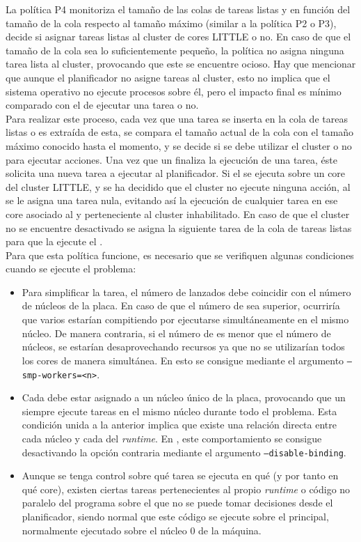 La política P4 monitoriza el tamaño de las colas de tareas listas y en
función del tamaño de la cola respecto al tamaño máximo (similar a la
política P2 o P3), decide si asignar tareas listas al cluster de cores
LITTLE o no. En caso de que el tamaño de la cola sea lo suficientemente
pequeño, la política no asigna ninguna tarea lista al cluster, provocando
que este se encuentre ocioso. Hay que mencionar que aunque el planificador
no asigne tareas al cluster, esto no implica que el sistema operativo no
ejecute procesos sobre él, pero el impacto final es mínimo comparado con el
de ejecutar una tarea o no.\\
Para realizar este proceso, cada vez que una tarea se inserta en la cola de
tareas listas o es extraída de esta, se compara el tamaño actual de la cola
con el tamaño máximo conocido hasta el momento, y se decide si se debe
utilizar el cluster o no para ejecutar acciones. Una vez que un \wt
finaliza la ejecución de una tarea, éste solicita una nueva tarea a
ejecutar al planificador. Si el \wt se ejecuta sobre un core del cluster
LITTLE, y se ha decidido que el cluster no ejecute ninguna acción, al \wt
se le asigna una tarea nula, evitando así la ejecución de cualquier tarea
en ese core asociado al \wt y perteneciente al cluster inhabilitado. En
caso de que el cluster no se encuentre desactivado se asigna la siguiente
tarea de la cola de tareas listas para que la ejecute el \wt.\\
Para que esta política funcione, es necesario que se verifiquen algunas
condiciones cuando se ejecute el problema:

\begin{itemize}
\item Para simplificar la tarea, el número de \wts lanzados debe coincidir
  con el número de núcleos de la placa. En caso de que el número de \wts sea
  superior, ocurriría que varios \wts estarían compitiendo por ejecutarse
  simultáneamente en el mismo núcleo. De manera contraria, si el número de
  \wts es menor que el número de núcleos, se estarían desaprovechando
  recursos ya que no se utilizarían todos los cores de manera simultánea. En
  \nanos esto se consigue mediante el argumento \texttt{--smp-workers=<n>}.
\item Cada \wt debe estar asignado a un núcleo único de la placa,
  provocando que un \wt siempre ejecute tareas en el mismo núcleo durante
  todo el problema. Esta condición unida a la anterior implica que existe una
  relación directa entre cada núcleo y cada \wt del \emph{runtime}. En
  \nanos, este comportamiento se consigue desactivando la opción contraria
  mediante el argumento \texttt{--disable-binding}.
\item Aunque se tenga control sobre qué tarea se ejecuta en qué \wt (y por
  tanto en qué core), existen ciertas tareas pertenecientes al propio
  \emph{runtime} o código no paralelo del programa sobre el que no se puede
  tomar decisiones desde el planificador, siendo normal que este código se
  ejecute sobre el \wt principal, normalmente ejecutado sobre el núcleo 0 de
  la máquina.
\end{itemize}


